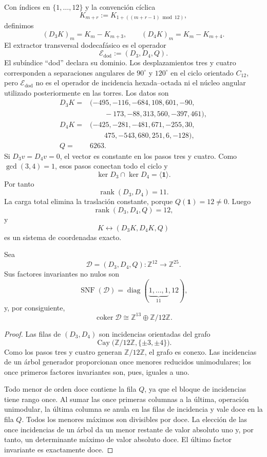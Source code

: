 Con índices en \(\{1,\ldots,12\}\) y la convención cíclica
\[
 K_{m+r}:=K_{1+((m+r-1)\bmod12)},
\]
definimos
\[
(D_3K)_m=K_m-K_{m+3},
\qquad
(D_4K)_m=K_m-K_{m+4}.
\]
El extractor transversal dodecafásico es el operador
\[
 \mathcal E_{\mathrm{dod}}
 :=(D_3,D_4,Q).
\]
El subíndice ``dod'' declara su dominio. Los desplazamientos tres y cuatro
corresponden a separaciones angulares de \(90^\circ\) y \(120^\circ\) en el
ciclo orientado \(C_{12}\), pero \(\mathcal E_{\mathrm{dod}}\) no es el operador de
incidencia hexada--octada ni el núcleo angular utilizado posteriormente en
las torres.
Los datos son
\[
\begin{aligned}
D_3K={}&(-495,-116,-684,108,601,-90,\\
       &\qquad-173,-88,313,560,-397,461),\\[1mm]
D_4K={}&(-425,-281,-481,671,-255,30,\\
       &\qquad475,-543,680,251,6,-128),\\[1mm]
Q={}&6263.
\end{aligned}
\]
Si \(D_3v=D_4v=0\), el vector es constante en los pasos tres y cuatro. Como
\(\gcd(3,4)=1\), esos pasos conectan todo el ciclo y
\[
\ker D_3\cap\ker D_4=\langle\mathbf1\rangle.
\]
Por tanto
\[
\operatorname{rank}(D_3,D_4)=11.
\]
La carga total elimina la traslación constante, porque
\(Q(\mathbf1)=12\ne0\). Luego
\[
\boxed{\operatorname{rank}(D_3,D_4,Q)=12,}
\]
y
\[
K\longleftrightarrow(D_3K,D_4K,Q)
\]
es un sistema de coordenadas exacto.

\begin{theorem}
\label{thm:smith-dodecafase}
Sea
\[
 \mathcal D=(D_3,D_4,Q):
 \mathbb Z^{12}\longrightarrow\mathbb Z^{25}.
\]
Sus factores invariantes no nulos son
\[
 \operatorname{SNF}(\mathcal D)
 =\operatorname{diag}(\underbrace{1,\ldots,1}_{11},12),
\]
y, por consiguiente,
\[
 \operatorname{coker}\mathcal D
 \cong\mathbb Z^{13}\oplus\mathbb Z/12\mathbb Z.
\]
\end{theorem}

\begin{proof}
Las filas de \((D_3,D_4)\) son incidencias orientadas del grafo
\[
 \operatorname{Cay}
 \bigl(\mathbb Z/12\mathbb Z,\{\pm3,\pm4\}\bigr).
\]
Como los pasos tres y cuatro generan \(\mathbb Z/12\mathbb Z\), el grafo
es conexo.
Las incidencias de un árbol generador proporcionan once menores reducidos
unimodulares; los once primeros factores invariantes son, pues, iguales a
uno.

Todo menor de orden doce contiene la fila \(Q\), ya que el bloque de
incidencias tiene rango once. Al sumar las once primeras columnas a la
última, operación unimodular, la última columna se anula en las filas de
incidencia y vale doce en la fila \(Q\). Todos los menores máximos son
divisibles por doce. La elección de las once incidencias de un árbol da un
menor restante de valor absoluto uno y, por tanto, un determinante máximo
de valor absoluto doce. El último factor invariante es exactamente doce.
\end{proof}

